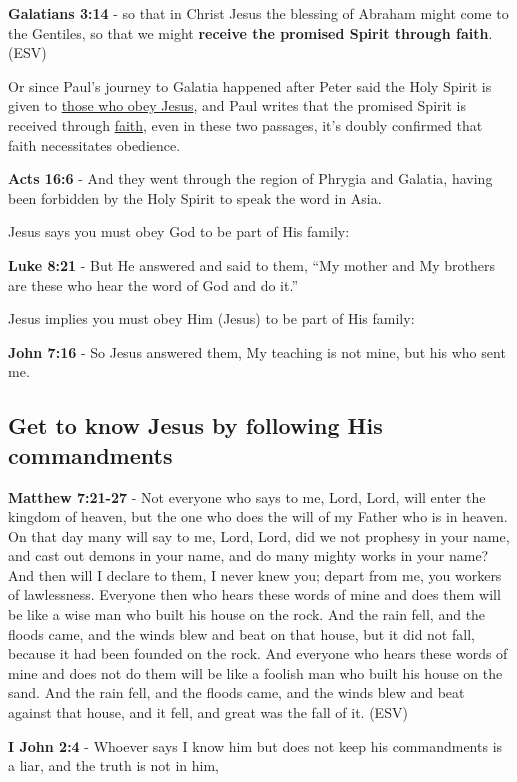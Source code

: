 \documentclass[11pt]{article}
\begin{document}
\textbf{Galatians 3:14} - so that in Christ Jesus the blessing of Abraham might come to the Gentiles, so that we might \textbf{receive the promised Spirit through faith}. (ESV)

Or since Paul's journey to Galatia happened after Peter said the Holy Spirit is given to \uline{those who obey Jesus}, and Paul writes that the promised Spirit is received through \uline{faith}, even in these two passages, it's doubly confirmed that faith necessitates obedience.

\textbf{Acts 16:6} - And they went through the region of Phrygia and Galatia, having been forbidden by the Holy Spirit to speak the word in Asia.

Jesus says you must obey God to be part of His family:

\textbf{Luke 8:21} - But He answered and said to them, “My mother and My brothers are these who hear the word of God and do it.”

Jesus implies you must obey Him (Jesus) to be part of His family:

\textbf{John 7:16} - So Jesus answered them, My teaching is not mine, but his who sent me.

\subsection{Get to know Jesus by following His commandments}
\label{sec:orgeaf6245}
\textbf{Matthew 7:21-27} - Not everyone who says to me, Lord, Lord, will enter the kingdom of heaven, but the one who does the will of my Father who is in heaven.  On that day many will say to me, Lord, Lord, did we not prophesy in your name, and cast out demons in your name, and do many mighty works in your name?  And then will I declare to them, I never knew you; depart from me, you workers of lawlessness.  Everyone then who hears these words of mine and does them will be like a wise man who built his house on the rock.  And the rain fell, and the floods came, and the winds blew and beat on that house, but it did not fall, because it had been founded on the rock.  And everyone who hears these words of mine and does not do them will be like a foolish man who built his house on the sand.  And the rain fell, and the floods came, and the winds blew and beat against that house, and it fell, and great was the fall of it. (ESV)

\textbf{I John 2:4} - Whoever says I know him but does not keep his commandments is a liar, and the truth is not in him,
\end{document}
